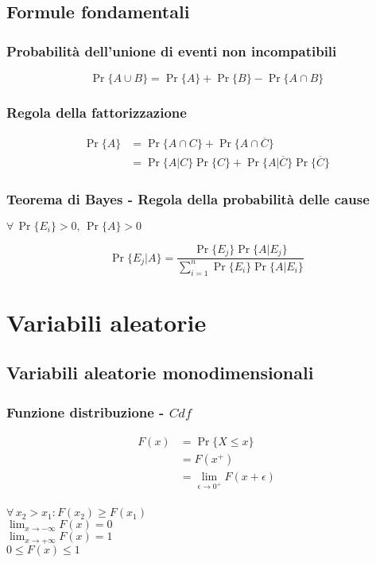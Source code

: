 \documentclass[a4paper,12pt]{article}
\theoremstyle{mystyle}
\begin{document}
\subsection{Formule fondamentali}
\subsubsection{Probabilità dell'unione di eventi non incompatibili}
\[
    \Pr\{A \cup B\} = \Pr\{A\} + \Pr\{B\} - \Pr\{A \cap B\}
\]

\subsubsection{Regola della fattorizzazione}
\[
    \begin{aligned}
    \Pr\{A\}
    &= \Pr\{A \cap C\} + \Pr\{A \cap \overline C\} \\
    &= \Pr\{A|C\} \Pr\{C\} + \Pr\{A|\overline C\} \Pr\{\overline C\}
    \end{aligned}
\]

\subsubsection{Teorema di Bayes - Regola della probabilità delle cause}
\(\forall \, \Pr \{E_i\}>0, \, \Pr\{A\}>0\)

\[
    \Pr \{E_j | A\} = \frac{\Pr \{E_j\} \Pr \{A|E_j\}}{\sum_{i=1}^{n} \Pr \{E_i\} \Pr\{A|E_i\}}
\]

\section{Variabili aleatorie}

\subsection{Variabili aleatorie monodimensionali}
\subsubsection{\texorpdfstring{Funzione distribuzione - \(Cdf\)}{Funzione distribuzione - Cdf}}
\[
    \begin{aligned}
        F(x)
        & = \Pr \{X \leq x\} \\
        & = F(x^+) \\
        & = \lim_{\epsilon \rightarrow 0^+} F(x+\epsilon)
    \end{aligned}
\] \\
\(\forall \, x_2 > x_1 : F(x_2) \geq F(x_1)\) \\
\(\lim_{x \rightarrow -\infty} F(x) = 0\) \\
\(\lim_{x \rightarrow + \infty} F(x) = 1\) \\
\(0 \leq F(x) \leq 1\)
\end{document}
